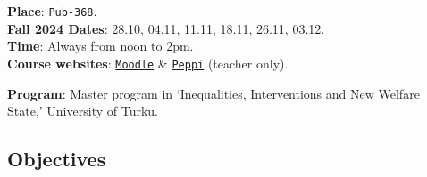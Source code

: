 \documentclass[letterpaper]{article}
\begin{document}
{\bf Place}: \texttt{Pub-368}.\\
{\bf Fall 2024 Dates}: 28.10, 04.11, 11.11, 18.11, 26.11, 03.12.\\
{\bf Time}: Always from noon to 2pm.\\

{\bf Course websites}: \href{https://moodle.utu.fi/course/view.php?id=26195}{\texttt{Moodle}} \& \href{https://planner.peppi.utu.fi/group/suunnittelijan-tyopoyta/toteutusten-hallinta?p_p_id=RealizationPortlet_WAR_realizationportlet&p_p_lifecycle=0&p_p_state=normal&p_p_mode=view&_RealizationPortlet_WAR_realizationportlet_struts.portlet.action=%2Frealization%2Fbasic&realization.realizationId=45184}{\texttt{Peppi}} (teacher only).




{\bf Program}: Master program in `Inequalities, Interventions and New Welfare State,' University of Turku.%





\subsection*{Objectives}

\end{document}
